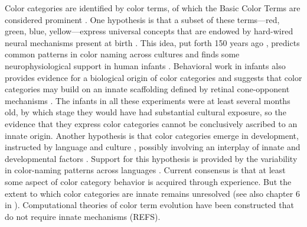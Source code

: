 \documentclass[9pt,biorxiv,lineno,onehalfspacing]{lapreprint}
\begin{document}
\begin{refsection}
Color categories are identified by color terms, of which the Basic Color Terms are considered prominent \citep{berlin_basic_1969}.
One hypothesis is that a subset of these terms---red, green, blue, yellow---express universal concepts \citep{heider_universals_1972,regier_focal_2005}
that are endowed by hard-wired neural mechanisms present at birth \citep{bornstein_categories_1976,lindsey_universality_2006}. 
This idea, put forth 150 years ago \citep{hering_zur_1875}, predicts common patterns in color naming across cultures \citep{baronchelli_modeling_2010,lindsey_hunter-gatherer_2015,abbott_focal_2016}
and finds some neurophysiological support in human infants \citep{clifford_electrophysiological_2009,yang_cortical_2016}. 
Behavioral work in infants also provides evidence for a biological origin of color categories \citep{franklin_new_2004,ozturk_language_2013} and suggests that color categories may build on an innate scaffolding defined by retinal cone-opponent mechanisms \citep{skelton_biological_2017}. 
The infants in all these experiments were at least several months old, by which stage they would have had substantial cultural exposure, so the evidence that they express color categories cannot be conclusively ascribed to an innate origin. 
Another hypothesis is that color categories emerge in development, instructed by language and culture \citep{davidoff_colour_1999,roberson_color_2005}, possibly involving an interplay of innate and developmental factors \citep{webster_variations_2002,kay_language_2006,franklin_lateralization_2008,regier_language_2009,paramei_online_2018}. 
Support for this hypothesis is provided by the variability in color-naming patterns across languages \citep{davidoff_colour_1999,webster_variations_2002,roberson_color_2005,kay_language_2006,gibson_color_2017, paramei_online_2018}. 
Current consensus is that at least some aspect of color category behavior is acquired through experience. 
But the extent to which color categories are innate remains unresolved \citep{davidoff_nature_2009,RN18696,RN18699}(see also chapter 6 in \citep{block_border_2023}). 
Computational theories of color term evolution have been constructed that do not require innate mechanisms (REFS). %


\end{refsection}
\end{document}
